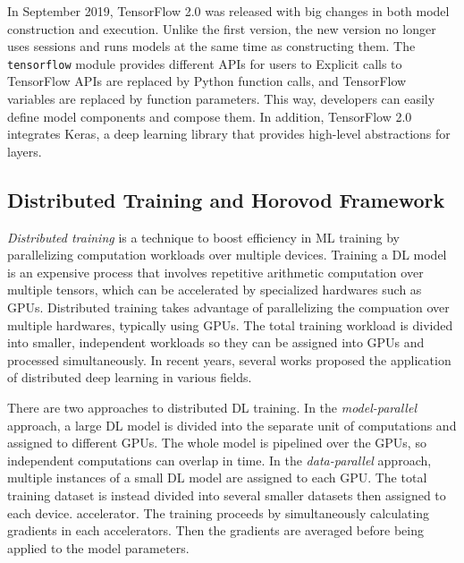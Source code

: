 
In September 2019, TensorFlow 2.0 was released\cite{tf2announce} with big
changes in both model construction and execution.
Unlike the first version, the new version no longer uses sessions and runs
models at the same time as constructing them.
The {\tt tensorflow} module provides different APIs for users to 
Explicit calls to TensorFlow APIs are replaced by Python function calls,
and TensorFlow variables are replaced by function parameters.
This way, developers can easily define model components and compose them. 
In addition, TensorFlow 2.0 integrates Keras\cite{keras},
a deep learning library that provides high-level abstractions for layers.


\subsection{Distributed Training and Horovod Framework}

\textit{Distributed training} is a technique to boost efficiency in ML training
by parallelizing computation workloads over multiple devices.
Training a DL model is an expensive process that involves repetitive
arithmetic computation over multiple tensors,
which can be accelerated by specialized hardwares such as GPUs. 
Distributed training takes advantage of parallelizing the compuation over
multiple hardwares, typically using GPUs.
The total training workload is divided into smaller, independent workloads
so they can be assigned into GPUs and processed simultaneously. 
In recent years, several works proposed the application of distributed
deep learning in various fields.

There are two approaches to distributed DL training.
In the \textit{model-parallel} approach, a large DL model is divided into 
the separate unit of computations and assigned to different GPUs. 
The whole model is pipelined over the GPUs, so independent computations
can overlap in time.
In the \textit{data-parallel} approach, multiple instances of a small DL model
are assigned to each GPU. The total training dataset is instead
divided into several smaller datasets then assigned to each device.
accelerator. The training proceeds by simultaneously calculating gradients
in each accelerators. Then the gradients are averaged before being 
applied to the model parameters.

